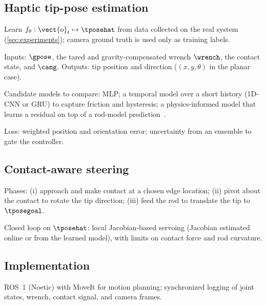 \subsection{Haptic tip-pose estimation}
\label{sec:method:estimation}
\begin{outline}
  \item Learn $f_{\theta}:\vect{o}_t\mapsto\tposehat$ from data collected on
    the real system (\cref{sec:experiments}); camera ground truth is used only
    as training labels.
  \item Inputs: $\gpose$, the tared and gravity-compensated wrench $\wrench$,
    the contact state, and $\cang$. Outputs: tip position and direction
    ($(x,y,\theta)$ in the planar case).
  \item Candidate models to compare: MLP; a temporal model over a short history
    (\eg 1D-CNN or GRU) to capture friction and hysteresis; a physics-informed
    model that learns a residual on top of a rod-model
    prediction~\cite{mishani2022realtime}. 
  \item Loss: weighted position and orientation error; uncertainty from an
    ensemble to gate the controller. 
\end{outline}

\subsection{Contact-aware steering}
\label{sec:method:steering}
\begin{outline}
  \item Phases: (i) approach and make contact at a chosen edge location;
    (ii) pivot about the contact to rotate the tip direction; (iii) feed the
    rod to translate the tip to $\tposegoal$.
  \item Closed loop on $\tposehat$: local Jacobian-based servoing (Jacobian
    estimated online or from the learned model), with limits on contact force
    and rod curvature. 
\end{outline}

\subsection{Implementation}
\label{sec:method:implementation}
\begin{outline}
  \item ROS~1 (Noetic) with MoveIt for motion planning; synchronized logging of
    joint states, wrench, contact signal, and camera frames.
\end{outline}
